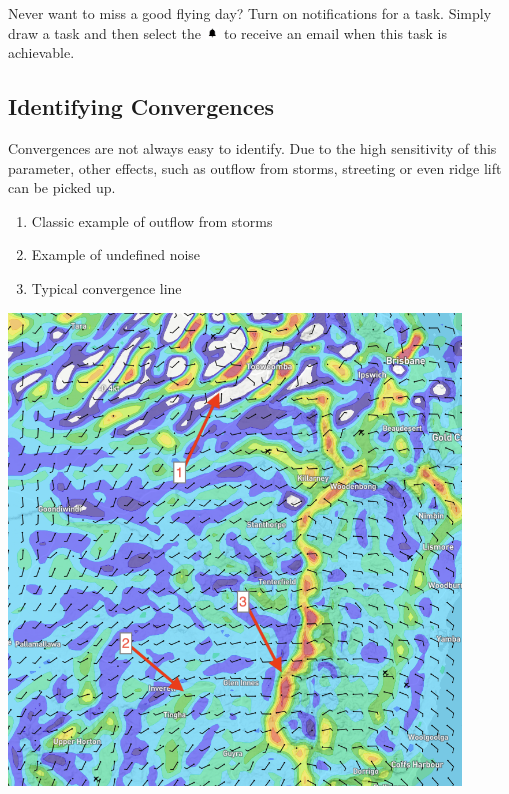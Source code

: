 \documentclass[11pt,a4paper]{article}
\begin{document}
\begin{tip}
\item Never want to miss a good flying day? Turn on notifications for a task. Simply draw a task and then select the \includegraphics[height=9pt]{images/icons/bell.png} to receive an email when this task is achievable.
\end{tip}

\subsection{Identifying Convergences}
Convergences are not always easy to identify. Due to the high sensitivity of this parameter, other effects, such as outflow from storms, streeting or even ridge lift can be picked up. 

\begin{enumerate}
\item Classic example of outflow from storms
\item Example of undefined noise
\item Typical convergence line
\end{enumerate}

\begin{center}
\includegraphics[width=12cm]{images/convergence.png}
\end{center}
\pagebreak
\end{document}
